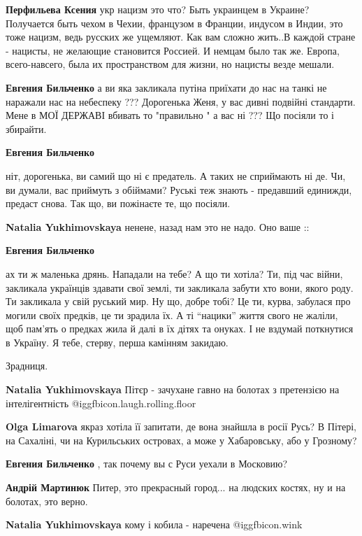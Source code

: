 \begin{itemize}
\begin{itemize}
\textbf{Перфильева Ксения} укр нацизм это что? Быть украинцем в Украине? Получается быть чехом в Чехии, французом в Франции, индусом в Индии, это тоже нацизм, ведь русских же ущемляют. Как вам сложно жить..В каждой стране - нацисты, не желающие становится Россией. И немцам было так же. Европа, всего-навсего, была их пространством для жизни, но нацисты везде мешали.

\textbf{Евгения Бильченко} а ви яка закликала путіна приїхати до нас на танкі не наражали нас на небеспеку ??? Дорогенька Женя, у вас дивні подвійні стандарти. Мене в МОЇ ДЕРЖАВІ вбивать то "правильно " а вас ні ??? Що посіяли то і збирайти.

\textbf{Евгения Бильченко} 

ніт, дорогенька, ви самий що ні є предатель. А таких не сприймають ні де. Чи, ви
думали, вас приймуть з обіймами? Руські теж знають - предавший единижди, предаст
снова. Так що, ви пожінаєте те, що посіяли.

\textbf{Natalia Yukhimovskaya} ненене, назад нам это не надо. Оно ваше ::

\textbf{Евгения Бильченко} 

ах ти ж маленька дрянь. Нападали на тебе? А що ти хотіла? Ти, під час
війни, закликала українців здавати свої землі, ти закликала забути хто вони, якого
роду. Ти закликала у свій руський мир. Ну що, добре тобі? Це ти, курва, забулася
про могили своїх предків, це ти зрадила їх. А ті \enquote{нацики} життя свого не
жаліли, щоб пам'ять о предках жила й далі в їх дітях та онуках. І не вздумай
поткнутися в Україну. Я тебе, стерву, перша камінням закидаю.

Зрадниця.

\textbf{Natalia Yukhimovskaya} Пітєр - зачухане гавно на болотах з претензією на інтелігентність  @igg{fbicon.laugh.rolling.floor} 

\textbf{Olga Limarova} якраз хотіла її запитати, де вона знайшла в росії Русь? В Пітері, на Сахаліні, чи на Курильських островах, а може у Хабаровську, або у Грозному?

\textbf{Евгения Бильченко} , так почему вы с Руси уехали в Московию?

\textbf{Андрій Мартинюк} Питер, это прекрасный город... на людских костях, ну и на болотах, это верно.

\textbf{Natalia Yukhimovskaya} кому і кобила - наречена  @igg{fbicon.wink} 


\end{itemize}
\end{itemize}
